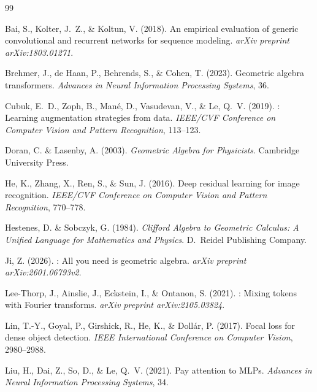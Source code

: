 \documentclass{article}
\begin{document}
\begin{thebibliography}{99}

Bai, S., Kolter, J.~Z., \& Koltun, V. (2018).
\newblock An empirical evaluation of generic convolutional and recurrent networks for sequence modeling.
\newblock \emph{arXiv preprint arXiv:1803.01271}.

Brehmer, J., de Haan, P., Behrends, S., \& Cohen, T. (2023).
\newblock Geometric algebra transformers.
\newblock \emph{Advances in Neural Information Processing Systems}, 36.

Cubuk, E.~D., Zoph, B., Man\'e, D., Vasudevan, V., \& Le, Q.~V. (2019).
: Learning augmentation strategies from data.
\newblock \emph{IEEE/CVF Conference on Computer Vision and Pattern Recognition}, 113--123.

Doran, C. \& Lasenby, A. (2003).
\newblock \emph{Geometric Algebra for Physicists}.
\newblock Cambridge University Press.

He, K., Zhang, X., Ren, S., \& Sun, J. (2016).
\newblock Deep residual learning for image recognition.
\newblock \emph{IEEE/CVF Conference on Computer Vision and Pattern Recognition}, 770--778.

Hestenes, D. \& Sobczyk, G. (1984).
\newblock \emph{Clifford Algebra to Geometric Calculus: A Unified Language for Mathematics and Physics}.
\newblock D.~Reidel Publishing Company.

Ji, Z. (2026).
: All you need is geometric algebra.
\newblock \emph{arXiv preprint arXiv:2601.06793v2}.

Lee-Thorp, J., Ainslie, J., Eckstein, I., \& Ontanon, S. (2021).
: Mixing tokens with Fourier transforms.
\newblock \emph{arXiv preprint arXiv:2105.03824}.

Lin, T.-Y., Goyal, P., Girshick, R., He, K., \& Doll\'ar, P. (2017).
\newblock Focal loss for dense object detection.
\newblock \emph{IEEE International Conference on Computer Vision}, 2980--2988.

Liu, H., Dai, Z., So, D., \& Le, Q.~V. (2021).
\newblock Pay attention to {MLPs}.
\newblock \emph{Advances in Neural Information Processing Systems}, 34.


\end{thebibliography}
\end{document}
